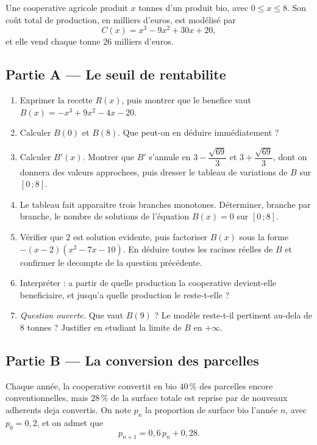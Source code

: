 Une cooperative agricole produit $x$ tonnes d'un produit bio, avec $0 \leq x \leq 8$.
Son coût total de production, en milliers d'euros, est modélisé par
\[ C(x) = x^3 - 9x^2 + 30x + 20, \]
et elle vend chaque tonne $26$ milliers d'euros.

\subsection*{Partie A — Le seuil de rentabilite}

\begin{enumerate}
  \item Exprimer la recette $R(x)$, puis montrer que le benefice vaut
  $B(x) = -x^3 + 9x^2 - 4x - 20$.
  \item Calculer $B(0)$ et $B(8)$. Que peut-on en déduire immédiatement ?
  \item Calculer $B'(x)$. Montrer que $B'$ s'annule en $3 - \dfrac{\sqrt{69}}{3}$ et
  $3 + \dfrac{\sqrt{69}}{3}$, dont on donnera des valeurs approchees, puis dresser
  le tableau de variations de $B$ sur $[0\,;8]$.
  \item Le tableau fait apparaitre trois branches monotones. Déterminer, branche
  par branche, le nombre de solutions de l'équation $B(x) = 0$ sur $[0\,;8]$.
  \item Vérifier que $2$ est solution evidente, puis factoriser $B(x)$ sous la
  forme $-(x-2)\left(x^2 - 7x - 10\right)$. En déduire toutes les racines réelles
  de $B$ et confirmer le decompte de la question précédente.
  \item Interpréter : a partir de quelle production la cooperative devient-elle
  beneficiaire, et jusqu'a quelle production le reste-t-elle ?
  \item \emph{Question ouverte.} Que vaut $B(9)$ ? Le modèle reste-t-il pertinent
  au-dela de $8$ tonnes ? Justifier en etudiant la limite de $B$ en $+\infty$.
\end{enumerate}

\subsection*{Partie B — La conversion des parcelles}

Chaque année, la cooperative convertit en bio $40\,\%$ des parcelles encore
conventionnelles, mais $28\,\%$ de la surface totale est reprise par de
nouveaux adherents deja convertis. On note $p_n$ la proportion de surface bio
l'année $n$, avec $p_0 = 0{,}2$, et on admet que
\[ p_{n+1} = 0{,}6\,p_n + 0{,}28. \]


